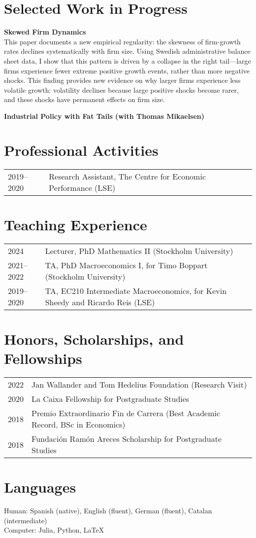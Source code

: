 \documentclass[a4paper,12pt]{article}
\begin{document}
\section*{Selected Work in Progress}

\noindent\textbf{Skewed Firm Dynamics}\\
This paper documents a new empirical regularity: the skewness of firm-growth rates declines systematically with firm size. Using Swedish administrative balance sheet data, I show that this pattern is driven by a collapse in the right tail—large firms experience fewer extreme positive growth events, rather than more negative shocks. This finding provides new evidence on why larger firms experience less volatile growth: volatility declines because large positive shocks become rarer, and these shocks have permanent effects on firm size.

\vspace{0.75em}
\noindent\textbf{Industrial Policy with Fat Tails (with Thomas Mikaelsen)}
\vspace{1em}
\section*{Professional Activities}
\begin{tabularx}{\linewidth}{@{}l X@{}}
2019--2020 & Research Assistant, The Centre for Economic Performance (LSE) \\
\end{tabularx}

\section*{Teaching Experience}
\begin{tabularx}{\linewidth}{@{}l X@{}}
2024 & Lecturer, PhD Mathematics II (Stockholm University) \\
2021--2022 & TA, PhD Macroeconomics I, for Timo Boppart (Stockholm University) \\
2019--2020 & TA, EC210 Intermediate Macroeconomics, for Kevin Sheedy and Ricardo Reis (LSE) \\
\end{tabularx}

\section*{Honors, Scholarships, and Fellowships}
\begin{tabularx}{\linewidth}{@{}l X@{}}
2022 & Jan Wallander and Tom Hedelius Foundation (Research Visit) \\
2020 & La Caixa Fellowship for Postgraduate Studies \\
2018 & Premio Extraordinario Fin de Carrera (Best Academic Record, BSc in Economics) \\
2018 & Fundación Ramón Areces Scholarship for Postgraduate Studies \\
\end{tabularx}

\section*{Languages}
Human: Spanish (native), English (fluent), German (fluent), Catalan (intermediate) \\
Computer: Julia, Python, \LaTeX

\vfill
{}
\end{document}
